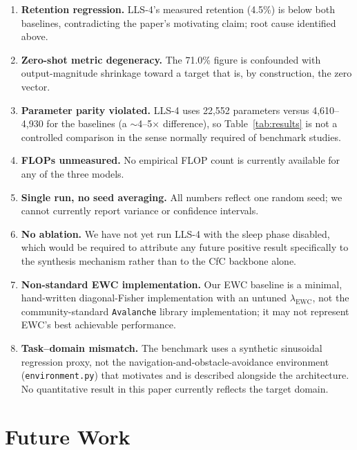\documentclass[11pt]{article}
\begin{document}
\begin{enumerate}
\item \textbf{Retention regression.} LLS-4's measured retention (4.5\%) is below both baselines, contradicting the paper's motivating claim; root cause identified above.
\item \textbf{Zero-shot metric degeneracy.} The 71.0\% figure is confounded with output-magnitude shrinkage toward a target that is, by construction, the zero vector.
\item \textbf{Parameter parity violated.} LLS-4 uses 22{,}552 parameters versus 4{,}610--4{,}930 for the baselines (a $\sim$4--5$\times$ difference), so Table~\ref{tab:results} is not a controlled comparison in the sense normally required of benchmark studies.
\item \textbf{FLOPs unmeasured.} No empirical FLOP count is currently available for any of the three models.
\item \textbf{Single run, no seed averaging.} All numbers reflect one random seed; we cannot currently report variance or confidence intervals.
\item \textbf{No ablation.} We have not yet run LLS-4 with the sleep phase disabled, which would be required to attribute any future positive result specifically to the synthesis mechanism rather than to the CfC backbone alone.
\item \textbf{Non-standard EWC implementation.} Our EWC baseline is a minimal, hand-written diagonal-Fisher implementation with an untuned $\lambda_{\text{EWC}}$, not the community-standard \texttt{Avalanche} library implementation; it may not represent EWC's best achievable performance.
\item \textbf{Task--domain mismatch.} The benchmark uses a synthetic sinusoidal regression proxy, not the navigation-and-obstacle-avoidance environment (\texttt{environment.py}) that motivates and is described alongside the architecture. No quantitative result in this paper currently reflects the target domain.
\end{enumerate}

\section{Future Work}
\label{sec:future}
\end{document}
